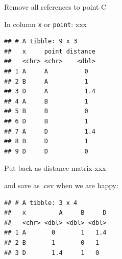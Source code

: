 \documentclass[ignorenonframetext,]{beamer}
\newenvironment{Shaded}{\begin{snugshade}}{\end{snugshade}}
\newcommand{\DecValTok}[1]{\textcolor[rgb]{0.00,0.00,0.81}{#1}}
\newcommand{\KeywordTok}[1]{\textcolor[rgb]{0.13,0.29,0.53}{\textbf{#1}}}
\newcommand{\NormalTok}[1]{#1}
\newcommand{\OperatorTok}[1]{\textcolor[rgb]{0.81,0.36,0.00}{\textbf{#1}}}
\newcommand{\StringTok}[1]{\textcolor[rgb]{0.31,0.60,0.02}{#1}}
\begin{document}
\begin{frame}[fragile]{Remove all references to point C}
\protect\hypertarget{remove-all-references-to-point-c}{}

In column \texttt{x} or \texttt{point}: xxx

\small

\begin{Shaded}
\end{Shaded}

\begin{verbatim}
## # A tibble: 9 x 3
##   x     point distance
##   <chr> <chr>    <dbl>
## 1 A     A          0  
## 2 B     A          1  
## 3 D     A          1.4
## 4 A     B          1  
## 5 B     B          0  
## 6 D     B          1  
## 7 A     D          1.4
## 8 B     D          1  
## 9 D     D          0
\end{verbatim}

\normalsize

\end{frame}

\begin{frame}[fragile]{Put back as distance matrix xxx}
\protect\hypertarget{put-back-as-distance-matrix-xxx}{}

and save as .csv when we are happy:

\begin{Shaded}
\end{Shaded}

\begin{verbatim}
## # A tibble: 3 x 4
##   x         A     B     D
##   <chr> <dbl> <dbl> <dbl>
## 1 A       0       1   1.4
## 2 B       1       0   1  
## 3 D       1.4     1   0
\end{verbatim}

\begin{Shaded}
\end{Shaded}

\end{frame}
\end{document}
